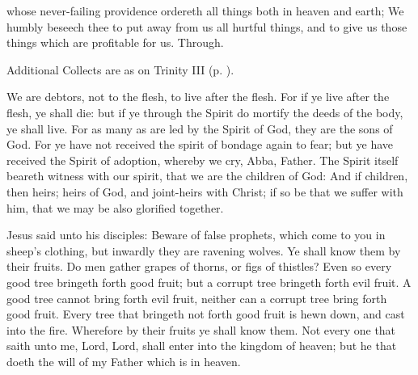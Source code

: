 \vspace{-0.5ex}
\collect
{} whose never-failing providence ordereth all things both in heaven and earth; We humbly beseech thee to put away from us all hurtful things, and to give us those things which are profitable for us. Through.
\begin{rubric}
    Additional Collects are as on Trinity III (p. \pageref{TrinityIII}).
\end{rubric}

 We are debtors, not to the flesh, to live after the flesh. For if ye live after the flesh, ye shall die: but if ye through the Spirit do mortify the deeds of the body, ye shall live. For as many as are led by the Spirit of God, they are the sons of God. For ye have not received the spirit of bondage again to fear; but ye have received the Spirit of adoption, whereby we cry, Abba, Father. The Spirit itself beareth witness with our spirit, that we are the children of God: And if children, then heirs; heirs of God, and joint-heirs with Christ; if so be that we suffer with him, that we may be also glorified together.



 Jesus said unto his disciples: Beware of false prophets, which come to you in sheep's clothing, but inwardly they are ravening wolves. Ye shall know them by their fruits. Do men gather grapes of thorns, or figs of thistles? Even so every good tree bringeth forth good fruit; but a corrupt tree bringeth forth evil fruit. A good tree cannot bring forth evil fruit, neither can a corrupt tree bring forth good fruit. Every tree that bringeth not forth good fruit is hewn down, and cast into the fire. Wherefore by their fruits ye shall know them. Not every one that saith unto me, Lord, Lord, shall enter into the kingdom of heaven; but he that doeth the will of my Father which is in heaven.


